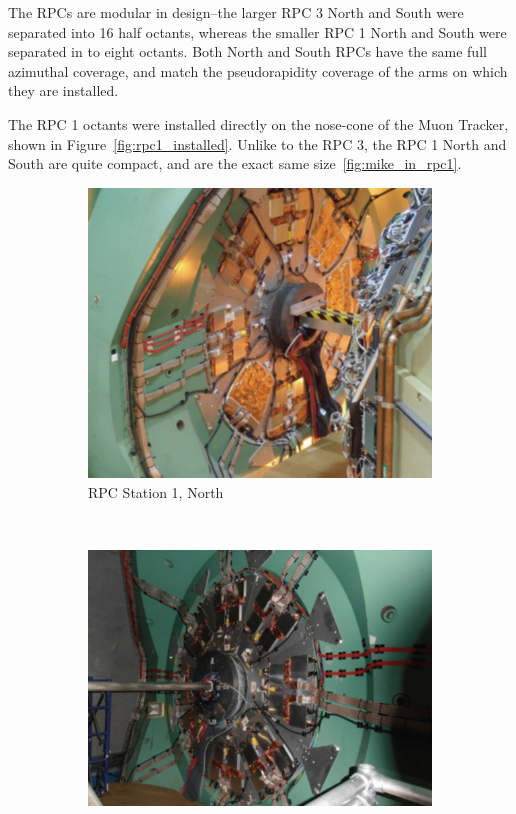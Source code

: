 The RPCs are modular in design--the larger RPC 3 North and South were separated
into 16 half octants, whereas the smaller RPC 1 North and South were separated
in to eight octants. Both North and South RPCs have the same full azimuthal
coverage, and match the pseudorapidity coverage of the arms on which they are
installed.

The RPC 1 octants were installed directly on the nose-cone of the Muon Tracker,
shown in Figure~\ref{fig:rpc1_installed}. Unlike to the RPC 3, the RPC 1 North
and South are quite compact, and are the exact same size~\ref{fig:mike_in_rpc1}.


\begin{figure}
  \centering
  \begin{subfigure}[b]{0.5\textwidth}
    \centering
    \includegraphics[width=\linewidth]{./figures/rpc1_north_installed}
    \caption{RPC Station 1, North}
    \label{fig:rpc1n}
  \end{subfigure}%
  ~
  \begin{subfigure}[b]{0.5\textwidth}
    \centering
    \includegraphics[width=\linewidth]{./figures/rpc1_south_installed}

\end{subfigure}
\end{figure}
